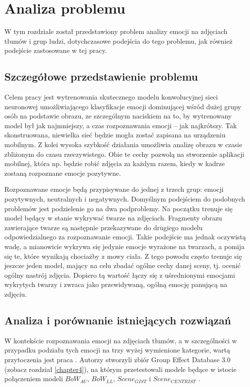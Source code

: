 \chapter{Analiza problemu}
\thispagestyle{chapterBeginStyle}
\label{chapter3}


W tym rozdziale został przedstawiony problem analizy emocji na zdjęciach tłumów i grup ludzi, dotychczasowe podejścia do tego problemu, jak również podejście zastosowane w tej pracy.


\section{Szczegółowe przedstawienie problemu}
Celem pracy jest wytrenowania skutecznego modelu konwolucyjnej sieci neuronowej umożliwiającego klasyfikacje emocji dominującej wśród dużej grupy osób na podstawie obrazu, ze szczególnym naciskiem na to, by wytrenowany model był jak najmniejszy, a czas rozpoznawania emocji -- jak najkrótszy. Tak skonstruowana, niewielka sieć będzie mogła zostać zapisana na urządzeniu mobilnym. Z kolei wysoka szybkość działania umożliwia analizę obrazu w czasie zbliżonym do czasu rzeczywistego. Obie te cechy pozwolą na stworzenie aplikacji mobilnej, która np. będzie robić zdjęcia za każdym razem, kiedy w kadrze zostaną rozpoznane emocje pozytywne.

Rozpoznawane emocje będą przypisywane do jednej z trzech grup: emocji pozytywnych, neutralnych i negatywnych. Domyślnym podejściem do podobnych problemów jest podzielenie go na dwa podproblemy. Na początku trenuje się model będący w stanie wykrywać twarze na zdjęciach. Fragmenty obrazu zawierające twarze są następnie przekazywane do drugiego modelu odpowiedzialnego za rozpoznawanie emocji.
Takie podejście ma jednak oczywistą wadę, a mianowicie wykrywa się jedynie emocje wyrażone na twarzach, a pomija się te, które wynikają chociażby z mowy ciała. Z tego powodu często trenuje się jeszcze jeden model, mający na celu zbadać ogólne cechy danej sceny, tj. ocenić ogólny nastrój zdjęcia. Dopiero tą wartość łączy się z uśrednionymi emocjami wykrytych twarzy i zwraca jako przewidywaną, ogólną emocję panującą na zdjęciu.
 
 
\section{Analiza i porównanie istniejących rozwiązań}
W kontekście rozpoznawania emocji na zdjęciach tłumów, a w szczególności w przypadku podziału tych emocji na trzy wyżej wymienione kategorie, wartą przytoczenia jest praca \cite{GAD}. Autorzy stworzyli zbiór Group Effect Database 3.0 (zobacz rozdział \ref{chapter4}), na którym przetestowali modele będące w istocie połączeniem modeli $BoW_{AU}$, $BoW_{LL}$, $Scene_{GIST}$ \cite{GIST} i $Scene_{CENTRIST}$ \cite{CENTRIST}.

